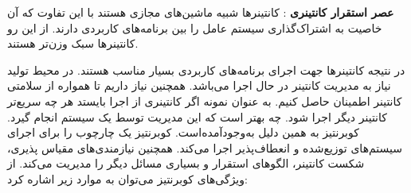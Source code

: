 \textbf{عصر استقرار کانتینری}
: کانتینرها شبیه ماشین‌های مجازی هستند با این تفاوت که آن خاصیت به اشتراک‌گذاری سیستم عامل را بین برنامه‌های کاربردی دارند. از این رو کانتینرها سبک وزن‌تر هستند. 
\newline

در نتیجه کانتینرها جهت اجرای برنامه‌های کاربردی بسیار مناسب هستند. در محیط تولید نیاز به مدیریت کانتینر در حال اجرا می‌باشد. همچنین نیاز داریم تا همواره از سلامتی کانتینر اطمینان حاصل کنیم. به عنوان نمونه اگر کانتینری از اجرا بایستد هر چه سریع‌تر کانتینر دیگر اجرا شود. چه بهتر است که این مدیریت توسط یک سیستم انجام گیرد. کوبرنتیز به همین دلیل به‌وجود‌آمده‌است. کوبرنتیز یک چارچوب را برای اجرای سیستم‌های توزیع‌شده و انعطاف‌پذیر اجرا می‌کند. همچنین نیازمندی‌های مقیاس پذیری، شکست کانتینر، الگوهای استقرار و بسیاری مسائل دیگر را مدیریت می‌کند. 
\newline
\newline
از ویژگی‌های کوبرنتیز می‌توان به موارد زیر اشاره کرد:
